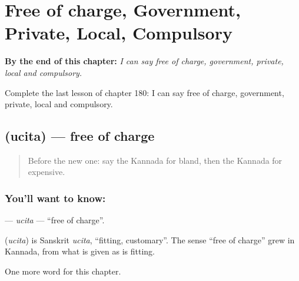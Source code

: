 
\chapter{Free of charge, Government, Private, Local, Compulsory}
\label{ch:ka-free-of-charge-government-private-local-compulsory}

\begin{chapteropening}
\textbf{By the end of this chapter:} \emph{I can say free of charge, government, private, local and compulsory.}

Complete the last lesson of chapter 180: I can say free of charge, government, private, local and compulsory.
\end{chapteropening}

\section[\texorpdfstring{\kn{ಉಚಿತ} (ucita)}{ಉಚಿತ (ucita)}]{ (ucita) — free of charge}

\label{lesson:KA-C180-ucita}



\begin{quote}
Before the new one: say the Kannada for bland, then the Kannada for expensive.
\end{quote}

\subsection*{You'll want to know: }
\textbf{} — \emph{ucita} — \textquotedblleft{}free of charge\textquotedblright{}.

\begin{cousinweb}
\textbf{} (\emph{ucita}) is Sanskrit \emph{ucita}, \textquotedblleft{}fitting, customary\textquotedblright{}. The sense \textquotedblleft{}free of charge\textquotedblright{} grew in Kannada, from what is given as is fitting.
\end{cousinweb}

\begin{grammarlens}[title={What you've built}]
One more word for this chapter.
\end{grammarlens}

